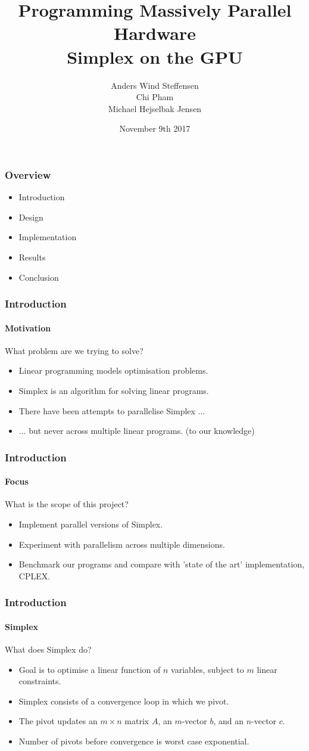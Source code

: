 \documentclass{beamer}
\title{Programming Massively Parallel Hardware\\\textbf{Simplex on the GPU}}
\author[]{%
  Anders Wind Steffensen \\
  Chi Pham \\
  Michael Hejselbak Jensen \\
}
\institute{Department of Computer Science (DIKU)\\University of Copenhagen}
\date[3/3]{November 9th 2017}
\renewcommand{\emph}[1]{\textcolor{structure}{#1}}
\begin{document}
\titleslide


\begin{frame}
  \frametitle{Overview}
  \begin{itemize}
  \item Introduction
  \item Design
  \item Implementation
  \item Results
  \item Conclusion
  \end{itemize}
\end{frame}


\begin{frame}
\frametitle{Introduction}
\framesubtitle{Motivation}
\centering
{\Large What problem are we trying to solve?}

\begin{itemize}
	\item Linear programming models optimisation problems.
	\item Simplex is an algorithm for solving linear programs.
	\item There have been attempts to parallelise Simplex ...
	\pause
	\item ... but never across multiple linear programs. {\tiny (to our knowledge)}
\end{itemize}
\end{frame}

\begin{frame}
\frametitle{Introduction}
\framesubtitle{Focus}
\centering
{\Large What is the scope of this project?}

\begin{itemize}
\item Implement parallel versions of Simplex.
\item Experiment with parallelism across multiple dimensions.
\item Benchmark our programs and compare with 'state of the art' implementation, CPLEX.
\end{itemize}
\end{frame}

\begin{frame}[fragile]
\frametitle{Introduction}
\framesubtitle{Simplex}
\centering
{\Large What does Simplex do?}

\begin{itemize}
\item Goal is to optimise a linear function of $n$ variables, subject to $m$ linear constraints.
\item Simplex consists of a convergence loop in which we \emph{pivot}.
\item The \emph{pivot} updates an $m \times n$ matrix $A$, an $m$-vector $b$, and an $n$-vector $c$.
\item Number of pivots before convergence is worst case exponential.
\end{itemize}
\end{frame}
\end{document}
